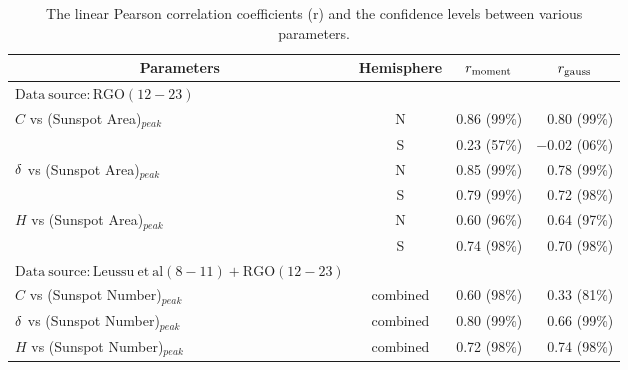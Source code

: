 \documentclass[preprint2,times,tighten]{aastex61}
\begin{document}
 \begin{table*}%
\begin{center}
\centering
\caption{The linear Pearson correlation coefficients (r) 
and the confidence levels between various parameters.}  
\vspace{0.2cm}
\label{cc_comp}
\begin{tabular}{lccr}
  \hline
   \multicolumn{1}{c}{Parameters} & \multicolumn{1}{c}{Hemisphere} & \multicolumn{1}{c}{$r_{\rm{moment}}$}  & \multicolumn{1}{c}{$r_{\rm{gauss}}$} \\
     \hline
       \textbf{$\mathrm{Data~source: RGO (12-23)}$} &  &   & \\
     \hline
       $C$ vs (Sunspot Area)$_{peak}$& N & 0.86 (99\%) &  0.80 (99\%)\\
                                          & S & 0.23 (57\%) & $-$0.02 (06\%)\\
  $\rm{\delta}$ vs (Sunspot Area)$_{peak}$& N & 0.85 (99\%) &  0.78 (99\%)\\
                                          & S & 0.79 (99\%) &  0.72 (98\%)\\
  $H$ vs (Sunspot Area)$_{peak}$ & N & 0.60 (96\%) &  0.64 (97\%)\\
                                          & S & 0.74 (98\%) &  0.70 (98\%)\\
  \hline
       \textbf{$\mathrm{Data~source: Leussu~et~al (8-11)+ RGO (12-23)}$}&  &   & \\
  \hline
  $C$ vs (Sunspot Number)$_{peak}$& combined & 0.60 (98\%) &  0.33 (81\%)\\
$\rm{\delta}$ vs (Sunspot Number)$_{peak}$& combined & 0.80 (99\%) &  0.66 (99\%)\\
$H$ vs (Sunspot Number)$_{peak}$& combined & 0.72 (98\%) & 0.74 (98\%)\\


\end{tabular}
\end{center}
\end{table*}
\end{document}
